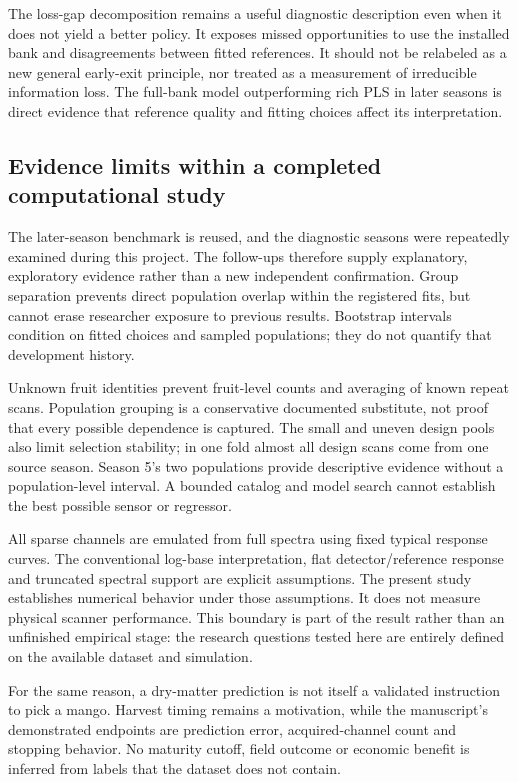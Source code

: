\documentclass[11pt,a4paper]{article}
\begin{document}
The loss-gap decomposition remains a useful diagnostic description even when it does not yield a better policy. It exposes missed opportunities to use the installed bank and disagreements between fitted references. It should not be relabeled as a new general early-exit principle, nor treated as a measurement of irreducible information loss. The full-bank model outperforming rich PLS in later seasons is direct evidence that reference quality and fitting choices affect its interpretation.

\subsection{Evidence limits within a completed computational study}
The later-season benchmark is reused, and the diagnostic seasons were repeatedly examined during this project. The follow-ups therefore supply explanatory, exploratory evidence rather than a new independent confirmation. Group separation prevents direct population overlap within the registered fits, but cannot erase researcher exposure to previous results. Bootstrap intervals condition on fitted choices and sampled populations; they do not quantify that development history.

Unknown fruit identities prevent fruit-level counts and averaging of known repeat scans. Population grouping is a conservative documented substitute, not proof that every possible dependence is captured. The small and uneven design pools also limit selection stability; in one fold almost all design scans come from one source season. Season 5's two populations provide descriptive evidence without a population-level interval. A bounded catalog and model search cannot establish the best possible sensor or regressor.

All sparse channels are emulated from full spectra using fixed typical response curves. The conventional log-base interpretation, flat detector/reference response and truncated spectral support are explicit assumptions. The present study establishes numerical behavior under those assumptions. It does not measure physical scanner performance. This boundary is part of the result rather than an unfinished empirical stage: the research questions tested here are entirely defined on the available dataset and simulation.

For the same reason, a dry-matter prediction is not itself a validated instruction to pick a mango. Harvest timing remains a motivation, while the manuscript's demonstrated endpoints are prediction error, acquired-channel count and stopping behavior. No maturity cutoff, field outcome or economic benefit is inferred from labels that the dataset does not contain.
\end{document}

